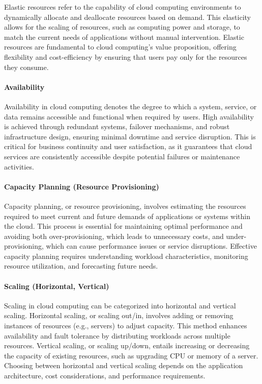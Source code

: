 \documentclass[10pt, landscape]{article}
\begin{document}
\begin{multicols*}{4}
Elastic resources refer to the capability of cloud computing
environments to dynamically allocate and deallocate resources based on
demand. This elasticity allows for the scaling of resources, such as
computing power and storage, to match the current needs of applications
without manual intervention. Elastic resources are fundamental to cloud
computing's value proposition, offering flexibility and cost-efficiency
by ensuring that users pay only for the resources they consume.

\paragraph{Availability}\label{availability}

Availability in cloud computing denotes the degree to which a system,
service, or data remains accessible and functional when required by
users. High availability is achieved through redundant systems, failover
mechanisms, and robust infrastructure design, ensuring minimal downtime
and service disruption. This is critical for business continuity and
user satisfaction, as it guarantees that cloud services are consistently
accessible despite potential failures or maintenance activities.

\paragraph{Capacity Planning (Resource
Provisioning)}\label{capacity-planning-resource-provisioning}

Capacity planning, or resource provisioning, involves estimating the
resources required to meet current and future demands of applications or
systems within the cloud. This process is essential for maintaining
optimal performance and avoiding both over-provisioning, which leads to
unnecessary costs, and under-provisioning, which can cause performance
issues or service disruptions. Effective capacity planning requires
understanding workload characteristics, monitoring resource utilization,
and forecasting future needs.

\paragraph{Scaling (Horizontal,
Vertical)}\label{scaling-horizontal-vertical}

Scaling in cloud computing can be categorized into horizontal and
vertical scaling. Horizontal scaling, or scaling out/in, involves adding
or removing instances of resources (e.g., servers) to adjust capacity.
This method enhances availability and fault tolerance by distributing
workloads across multiple resources. Vertical scaling, or scaling
up/down, entails increasing or decreasing the capacity of existing
resources, such as upgrading CPU or memory of a server. Choosing between
horizontal and vertical scaling depends on the application architecture,
cost considerations, and performance requirements.


\end{multicols*}
\end{document}
